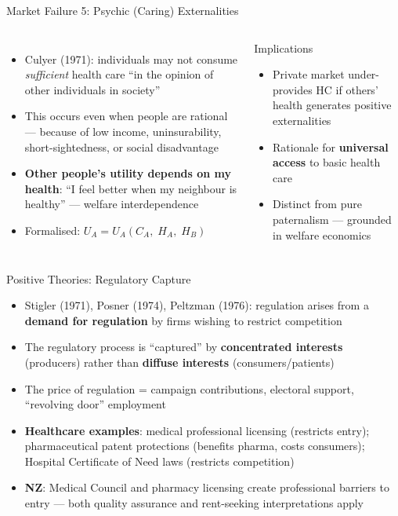 \documentclass[aspectratio=169, 12pt]{beamer}
\begin{document}
\begin{frame}{Market Failure 5: Psychic (Caring) Externalities}
  \begin{columns}
      \small
      \begin{itemize}
        \item Culyer (1971): individuals may not consume \emph{sufficient} health care
              ``in the opinion of other individuals in society''
        \item This occurs even when people are rational --- because of low income,
              uninsurability, short-sightedness, or social disadvantage
        \item \textbf{Other people's utility depends on my health}: ``I feel better when
              my neighbour is healthy'' --- welfare interdependence
        \item Formalised: $U_A = U_A(C_A,\; H_A,\; H_B)$
      \end{itemize}
      \begin{alertblock}{Implications}
        \small
        \begin{itemize}
          \item Private market under-provides HC if others' health generates positive externalities
          \item Rationale for \textbf{universal access} to basic health care
          \item Distinct from pure paternalism --- grounded in welfare economics
        \end{itemize}
      \end{alertblock}
  \end{columns}
\end{frame}

\begin{frame}{Positive Theories: Regulatory Capture}
  \begin{itemize}
    \item Stigler (1971), Posner (1974), Peltzman (1976): regulation arises from a
          \textbf{demand for regulation} by firms wishing to restrict competition
    \item The regulatory process is ``captured'' by \textbf{concentrated interests}
          (producers) rather than \textbf{diffuse interests} (consumers/patients)
    \item The price of regulation = campaign contributions, electoral support, ``revolving
          door'' employment
    \item \textbf{Healthcare examples}: medical professional licensing (restricts entry);
          pharmaceutical patent protections (benefits pharma, costs consumers);
          Hospital Certificate of Need laws (restricts competition)
    \item \textbf{NZ}: Medical Council and pharmacy licensing create professional barriers to
          entry --- both quality assurance and rent-seeking interpretations apply
  \end{itemize}
\end{frame}
\end{document}
